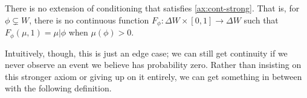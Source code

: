 %
\begin{prop}
	\label{prop:no-continuous-condition-ext}
	There is no extension of conditioning that satisfies \cref{ax:cont-strong}.
	That is,
	for $\phi\subsetneq W$,
	there is no continuous function
	$F_\phi : \Delta W \times [0,1] \to \Delta W$
	such that $F_\phi(\mu, 1) = \mu|\phi$ when $\mu(\phi) > 0$. 
\end{prop}
%
Intuitively, though, this is just an edge case; we can still get continuity
if we never observe an event we believe has probability zero. 
Rather than insisting on this stronger axiom or giving up on it entirely, we can get something in between 
with the following definition.

